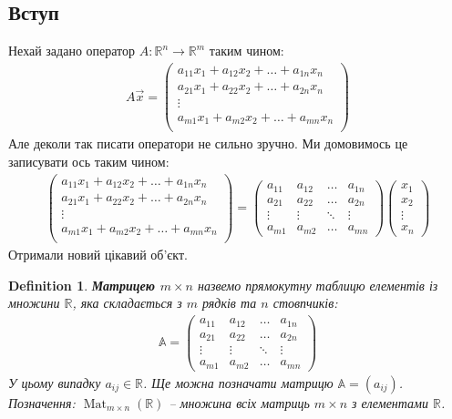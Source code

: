 \documentclass[a4paper, 10pt]{article}
\theoremstyle{theoremdd}
\newtheorem{definition}[theorem]{Definition}
\DeclareMathOperator{\Mat}{Mat}
\begin{document}
	\subsection{Вступ}
	Нехай задано оператор $A \colon \mathbb{R}^n \to \mathbb{R}^m$ таким чином:
	\begin{align*}
	A\vec{x} = \begin{pmatrix}
	a_{11}x_1 + a_{12}x_2 + \dots + a_{1n}x_n \\
	a_{21}x_1 + a_{22}x_2 + \dots + a_{2n}x_n \\
	\vdots \\
	a_{m1}x_1 + a_{m2}x_2 + \dots + a_{mn}x_n \\
	\end{pmatrix}
	\end{align*}
	Але деколи так писати оператори не сильно зручно. Ми домовимось це записувати ось таким чином:
	\begin{align*}
	\begin{pmatrix}
	a_{11}x_1 + a_{12}x_2 + \dots + a_{1n}x_n \\
	a_{21}x_1 + a_{22}x_2 + \dots + a_{2n}x_n \\
	\vdots \\
	a_{m1}x_1 + a_{m2}x_2 + \dots + a_{mn}x_n \\
	\end{pmatrix} = \begin{pmatrix}
	a_{11} & a_{12} & \dots & a_{1n} \\
	a_{21} & a_{22} & \dots & a_{2n} \\
	\vdots & \vdots & \ddots & \vdots \\
	a_{m1} & a_{m2} & \dots & a_{mn}
	\end{pmatrix} \begin{pmatrix}
	x_1 \\ x_2 \\ \vdots \\ x_n
	\end{pmatrix}
	\end{align*}
	Отримали новий цікавий об'єкт.
	\begin{definition}
	\textbf{Матрицею $m \times n$} назвемо прямокутну таблицю елементів із множини $\mathbb{R}$, яка складається з $m$ рядків та $n$ стовпчиків:
	\begin{align*}
	\mathbb{A} = \begin{pmatrix}
	a_{11} & a_{12} & \dots & a_{1n} \\
	a_{21} & a_{22} & \dots & a_{2n} \\
	\vdots & \vdots & \ddots & \vdots \\
	a_{m1} & a_{m2} & \dots & a_{mn}
	\end{pmatrix}
	\end{align*}
	У цьому випадку $a_{ij} \in \mathbb{R}$. Ще можна позначати матрицю $\mathbb{A} = (a_{ij})$.\\
	Позначення: $\Mat_{m \times n}(\mathbb{R})$ -- множина всіх матриць $m \times n$ з елементами $\mathbb{R}$.
	\end{definition}
	
\end{document}

